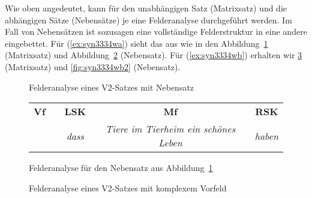 \begin{exe}
  \ex\label{ex:saetze1426}
  \begin{xlist}
  \end{xlist}
\end{exe}

Wie oben angedeutet, kann für den unabhängigen Satz (Matrixsatz) und die abhängigen Sätze (Nebensätze) je eine Felderanalyse durchgeführt werden.
Im Fall von Nebensätzen ist sozusagen eine vollständige Felderstruktur in eine andere eingebettet.
Für (\ref{ex:syn3334wa}) sieht das aus wie in den Abbildung~\ref{fig:syn3334wa1} (Matrixsatz) und Abbildung~\ref{fig:syn3334wa2} (Nebensatz).
Für (\ref{ex:syn3334wb}) erhalten wir \ref{fig:syn3334wb1} (Matrixsatz) und \ref{fig:syn3334wb2} (Nebensatz).

\begin{figure}
  \centering
  \caption{Felderanalyse eines V2-Satzes mit Nebensatz}
  \label{fig:syn3334wa1}
\end{figure}

\begin{figure}
  \centering
  \begin{tabular}{cp{0.1em}cp{0.1em}cp{0.1em}c}
    \textbf{Vf} && \textbf{LSK} && \textbf{Mf} && \textbf{RSK} \\
    \cmidrule{1-1}\cmidrule{3-3}\cmidrule{5-5}\cmidrule{7-7}
    && \textit{dass} && \textit{Tiere im Tierheim ein schönes Leben} && \textit{haben} \\
  \end{tabular}
  \caption{Felderanalyse für den Nebensatz aus Abbildung~\ref{fig:syn3334wa1}}
  \label{fig:syn3334wa2}
\end{figure}

\begin{figure}
  \centering
  \caption{Felderanalyse eines V2-Satzes mit komplexem Vorfeld}
  \label{fig:syn3334wb1}
\end{figure}

